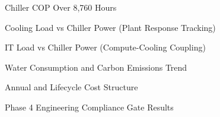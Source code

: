 \documentclass[12pt,a4paper]{report}
\begin{document}
\begin{figure}[H]
\centering
{}
\caption{Chiller COP Over 8{,}760 Hours}
\label{fig:chw_cop}
\end{figure}

\begin{figure}[H]
\centering
{}
\caption{Cooling Load vs Chiller Power (Plant Response Tracking)}
\label{fig:chw_load_power}
\end{figure}

\begin{figure}[H]
\centering
{}
\caption{IT Load vs Chiller Power (Compute-Cooling Coupling)}
\label{fig:chw_it_chiller}
\end{figure}

\begin{figure}[H]
\centering
{}
\caption{Water Consumption and Carbon Emissions Trend}
\label{fig:chw_water_carbon}
\end{figure}

\begin{figure}[H]
\centering
{}
\caption{Annual and Lifecycle Cost Structure}
\label{fig:chw_cost}
\end{figure}

\begin{figure}[H]
\centering
{}
\caption{Phase 4 Engineering Compliance Gate Results}
\label{fig:chw_gates}
\end{figure}
\end{document}
